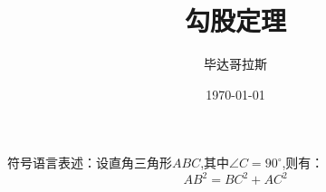 \documentclass{ctexart}	%
\title{\heiti 勾股定理}	%
\author{\kaishu 毕达哥拉斯}	%
\date{\today}
\newcommand\degree{^\circ}	%
\begin{document}
	\maketitle	%
	符号语言表述：设直角三角形$ABC$,其中$\angle C=90\degree$,则有：
	\begin{equation}	%
		AB^2=BC^2+AC^2
	\end{equation}
\end{document}
